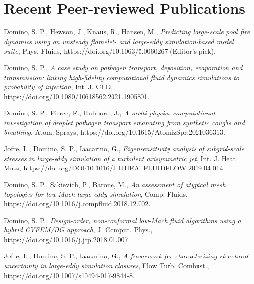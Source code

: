 \documentclass[letterpaper]{twentysecondcv_spd} %
\begin{document}
\section{Recent Peer-reviewed Publications}

\begin{twentyshort} %


 {Domino, S. P., Hewson, J., Knaus, R., Hansen, M., \textit{Predicting large-scale pool fire dynamics using an unsteady flamelet- and large-eddy simulation-based model suite}, Phys. Fluids, https://doi.org/10.1063/5.0060267 (Editor's pick).}

 {Domino,  S. P., \textit{A case study on pathogen transport, deposition, evaporation and transmission: linking high-fidelity computational fluid dynamics simulations to probability of infection}, Int. J. CFD, https://doi.org/10.1080/10618562.2021.1905801.}

 {Domino, S. P., Pierce, F., Hubbard, J.,  \textit{A multi-physics computational investigation of droplet pathogen transport emanating from synthetic coughs and breathing}, Atom. Sprays, https://doi.org/10.1615/AtomizSpr.2021036313.}

 {Jofre, L., Domino, S. P., Iaacarino, G.,  \textit{Eigensensitivity analysis of subgrid-scale stresses in large-eddy simulation of a turbulent axisymmetric jet}, Int. J. Heat Mass, https://doi.org/DOI:10.1016/J.IJHEATFLUIDFLOW.2019.04.014.}

 {Domino, S. P., Sakievich, P., Barone, M., \textit{An assessment of atypical mesh topologies for low-Mach large-eddy simulation}, Comp. Fluids, https://doi.org/10.1016/j.compfluid.2018.12.002.}

 {Domino, S. P., \textit{Design-order, non-conformal low-Mach fluid algorithms using a hybrid CVFEM/DG approach}, J. Comput. Phys., https://doi.org/10.1016/j.jcp.2018.01.007.}

 {Jofre, L., Domino, S. P.,  Iaacarino, G., \textit{A framework for characterizing structural uncertainty in large-eddy simulation closures}, Flow Turb. Combust., https://doi.org/10.1007/s10494-017-9844-8.}

\end{twentyshort} 
\end{document}
